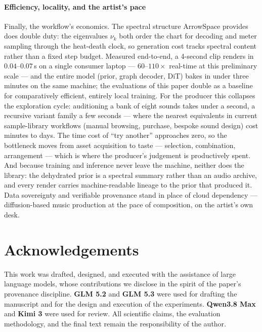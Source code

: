 \documentclass[12pt,a4paper]{article}
\begin{document}
\paragraph{Efficiency, locality, and the artist's pace}
Finally, the workflow's economics. The spectral structure ArrowSpace
provides does double duty: the eigenvalues $\nu_k$ both order the chart
for decoding and meter sampling through the heat-death clock, so
generation cost tracks spectral content rather than a fixed step
budget. Measured end-to-end, a 4-second clip renders in
$0.04$–$0.07$\,s on a single consumer laptop — $60$–$110\times$
real-time at this preliminary scale — and the entire model (prior,
graph decoder, DiT) bakes in under three minutes on the same machine;
the evaluations of this paper double as a baseline for comparatively
efficient, entirely local training. For the producer this collapses
the exploration cycle: auditioning a bank of eight sounds takes under
a second, a recursive variant family a few seconds — where the nearest
equivalents in current sample-library workflows (manual browsing,
purchase, bespoke sound design) cost minutes to days. The time cost of
``try another'' approaches zero, so the bottleneck moves from asset
acquisition to taste — selection, combination, arrangement — which is
where the producer's judgement is productively spent. And because
training and inference never leave the machine, neither does the
library: the dehydrated prior is a spectral summary rather than an
audio archive, and every render carries machine-readable lineage to
the prior that produced it. Data sovereignty and verifiable provenance
stand in place of cloud dependency — diffusion-based music production
at the pace of composition, on the artist's own desk.


\section*{Acknowledgements}
\label{sec:acknowledgements}

This work was drafted, designed, and executed with the assistance of
large language models, whose contributions we disclose in the spirit of
the paper's provenance discipline. \textbf{GLM 5.2} and \textbf{GLM 5.3}
were used for drafting the manuscript and for the design and execution
of the experiments. \textbf{Qwen3.8 Max} and \textbf{Kimi 3} were used
for review. All scientific claims, the evaluation methodology, and the
final text remain the responsibility of the author.
\end{document}

